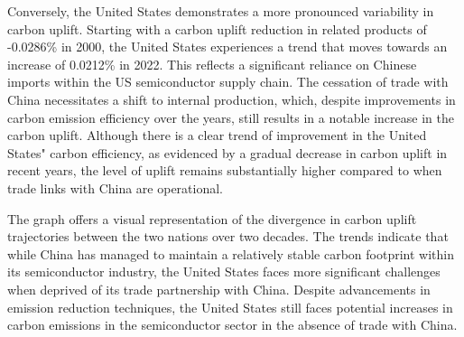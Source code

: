 Conversely, the United States demonstrates a more pronounced variability in carbon uplift. Starting with a carbon uplift reduction in related products of -0.0286\% in 2000, the United States experiences a trend that moves towards an increase of 0.0212\% in 2022. This reflects a significant reliance on Chinese imports within the US semiconductor supply chain. The cessation of trade with China necessitates a shift to internal production, which, despite improvements in carbon emission efficiency over the years, still results in a notable increase in the carbon uplift. Although there is a clear trend of improvement in the United States" carbon efficiency, as evidenced by a gradual decrease in carbon uplift in recent years, the level of uplift remains substantially higher compared to when trade links with China are operational.

The graph offers a visual representation of the divergence in carbon uplift trajectories between the two nations over two decades. The trends indicate that while China has managed to maintain a relatively stable carbon footprint within its semiconductor industry, the United States faces more significant challenges when deprived of its trade partnership with China. Despite advancements in emission reduction techniques, the United States still faces potential increases in carbon emissions in the semiconductor sector in the absence of trade with China.

